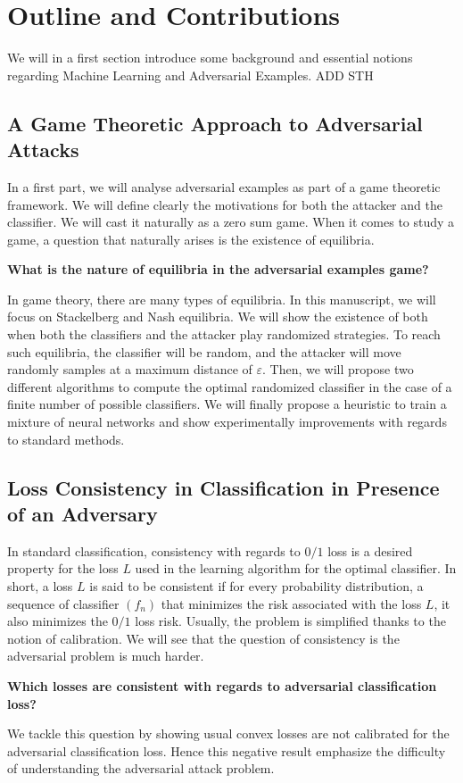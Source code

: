 \section{Outline and Contributions}
We will in a first section introduce some background and essential notions regarding Machine Learning and Adversarial Examples. ADD STH
\subsection{A Game Theoretic Approach to Adversarial Attacks}

In a first part, we will analyse adversarial examples as part of a game theoretic framework. We will define clearly the motivations for both the attacker and the classifier. We will cast it naturally as a zero sum game. When it comes to study a game, a question that naturally arises is the existence of equilibria.
\medskip
\begin{tcolorbox}[title=Question 1]
\textbf{What is the nature of equilibria in the adversarial examples game?}
\end{tcolorbox}
\medskip

In game theory, there are many types of equilibria. In this manuscript, we will focus on Stackelberg and Nash equilibria. We will show the existence of both when both the classifiers and the attacker play randomized strategies. To reach such equilibria, the classifier will be random, and the attacker will move randomly samples at a maximum distance of $\varepsilon$. Then, we will propose two different algorithms to compute the optimal randomized classifier in the case of a finite number of possible classifiers. We will finally propose a heuristic to train a mixture of neural networks and show experimentally improvements with regards to standard methods.



\subsection{Loss Consistency in Classification in Presence of an Adversary}
In standard classification, consistency with regards to $0/1$ loss is a desired property for the loss $L$ used in the learning algorithm for the optimal classifier. In short, a loss $L$ is said to be consistent if for every probability distribution, a sequence of classifier $(f_n)$ that minimizes the risk associated with the loss $L$, it also minimizes the $0/1$ loss risk. Usually, the problem is simplified thanks to the notion of calibration. We will see that the question of consistency is the adversarial problem is much harder.
\medskip
\begin{tcolorbox}[title=Question 2]
\textbf{Which losses are consistent with regards to adversarial classification loss?}
\end{tcolorbox}
\medskip
We tackle this question by showing usual convex losses are not calibrated for the adversarial classification loss. Hence this negative result emphasize the difficulty of understanding the adversarial attack problem. 

